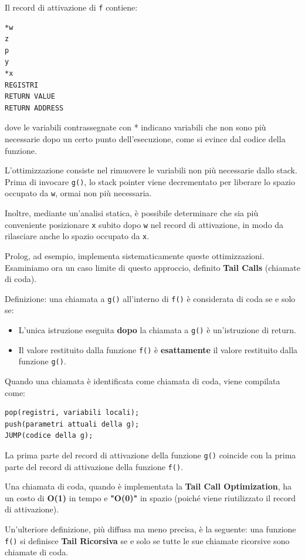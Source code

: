 \documentclass{article}
\begin{document}
Il record di attivazione di \texttt{f} contiene:
\begin{verbatim}
*w
z
p
y
*x
REGISTRI
RETURN VALUE
RETURN ADDRESS
\end{verbatim}
dove le variabili contrassegnate con * indicano variabili che non sono più necessarie dopo un certo punto dell'esecuzione, come si evince dal codice della funzione.

L'ottimizzazione consiste nel rimuovere le variabili non più necessarie dallo stack. Prima di invocare \texttt{g()}, lo stack pointer viene decrementato per liberare lo spazio occupato da \texttt{w}, ormai non più necessaria.

Inoltre, mediante un'analisi statica, è possibile determinare che sia più conveniente posizionare \texttt{x} subito dopo \texttt{w} nel record di attivazione, in modo da rilasciare anche lo spazio occupato da \texttt{x}.

Prolog, ad esempio, implementa sistematicamente queste ottimizzazioni.\vspace{14pt}\\
Esaminiamo ora un caso limite di questo approccio, definito \textbf{Tail Calls} (chiamate di coda).

Definizione: una chiamata a \texttt{g()} all'interno di \texttt{f()} è considerata di coda se e solo se:
\begin{itemize}
    \item L'unica istruzione eseguita \textbf{dopo} la chiamata a \texttt{g()} è un'istruzione di return.
    \item Il valore restituito dalla funzione \texttt{f()} è \textbf{esattamente} il valore restituito dalla funzione \texttt{g()}.
\end{itemize}

Quando una chiamata è identificata come chiamata di coda, viene compilata come:
\begin{verbatim}
pop(registri, variabili locali);
push(parametri attuali della g);
JUMP(codice della g);
\end{verbatim}
La prima parte del record di attivazione della funzione \texttt{g()} coincide con la prima parte del record di attivazione della funzione \texttt{f()}.

Una chiamata di coda, quando è implementata la \textbf{Tail Call Optimization}, ha un costo di \textbf{O(1)} in tempo e \textbf{"O(0)"} in spazio (poiché viene riutilizzato il record di attivazione).

Un'ulteriore definizione, più diffusa ma meno precisa, è la seguente: una funzione \texttt{f()} si definisce \textbf{Tail Ricorsiva} se e solo se tutte le sue chiamate ricorsive sono chiamate di coda.
\end{document}
